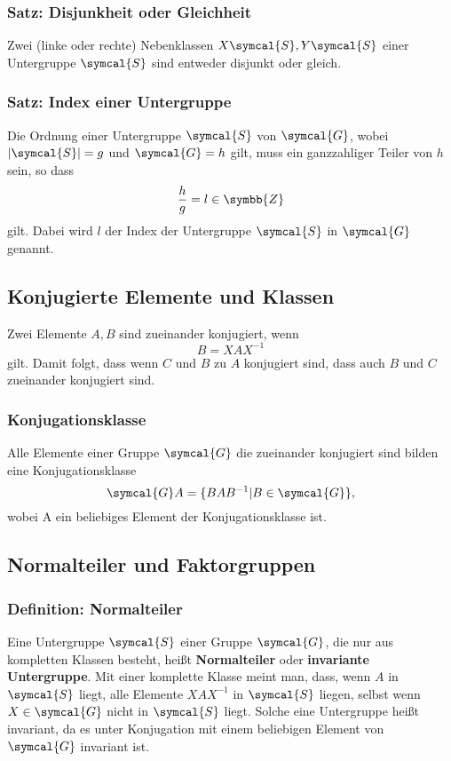 \documentclass[
  captions=tableheading,  %
  titlepage=firstiscover, %
]{scrartcl}
\begin{document}
\subsubsection{Satz: Disjunkheit oder Gleichheit}
Zwei (linke oder rechte) Nebenklassen $X\symcal{S}, Y\symcal{S}$ einer Untergruppe $\symcal{S}$ sind entweder 
disjunkt oder gleich.
\subsubsection{Satz: Index einer Untergruppe}
Die Ordnung einer Untergruppe $\symcal{S}$ von $\symcal{G}$, wobei 
$|\symcal{S}| = g$ und $\symcal{G} = h$ gilt, muss ein ganzzahliger Teiler von $h$ sein, so dass 
\begin{equation*}
  \frac{h}{g} = l \in \symbb{Z}
\end{equation*}
gilt.
Dabei wird $l$ der Index der Untergruppe $\symcal{S}$ in $\symcal{G}$ genannt.
\subsection{Konjugierte Elemente und Klassen}
Zwei Elemente $A, B$ sind zueinander konjugiert, wenn 
\begin{equation*}
  B = X A X^{-1}
\end{equation*}
gilt.
Damit folgt, dass wenn $C$ und $B$ zu $A$ konjugiert sind, dass auch $B$ und $C$ zueinander konjugiert sind.
\subsubsection{Konjugationsklasse}
Alle Elemente einer Gruppe $\symcal{G}$ die zueinander konjugiert sind bilden eine Konjugationsklasse
\begin{equation*}
  \symcal{G} A = \{BAB^{-1} | B \in \symcal{G} \},
\end{equation*}
wobei A ein beliebiges Element der Konjugationsklasse ist.
\subsection{Normalteiler und Faktorgruppen}
\subsubsection{Definition: Normalteiler}
\label{def:normalteiler}
Eine Untergruppe $\symcal{S}$ einer Gruppe $\symcal{G}$, die nur aus kompletten Klassen besteht,
heißt \textbf{Normalteiler} oder \textbf{invariante Untergruppe}.
Mit einer komplette Klasse meint man, dass, wenn $A$ in  $\symcal{S}$ liegt, alle Elemente $XAX^{-1}$ in $\symcal{S}$ liegen,
selbst wenn $X\in\symcal{G}$ nicht in $\symcal{S}$ liegt.
Solche eine Untergruppe heißt invariant, da es unter Konjugation mit einem beliebigen Element 
von $\symcal{G}$ invariant ist.
\end{document}
